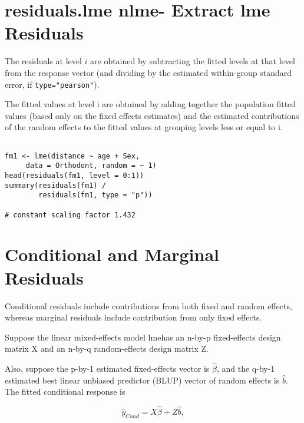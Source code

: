 \documentclass[residuals.tex]{subfiles}
\begin{document}
\section{residuals.lme {nlme}- Extract lme Residuals}

The residuals at level $i$ are obtained by subtracting the fitted levels at that level from the response vector (and dividing by the estimated within-group standard error, if \texttt{type="pearson"}). 

The fitted values at level i are obtained by adding together the population fitted values (based only on the fixed effects estimates) and the estimated contributions of the random effects to the fitted values at grouping levels less or equal to i.
 
 
\begin{framed}
\begin{verbatim}

fm1 <- lme(distance ~ age + Sex, 
     data = Orthodont, random = ~ 1)
head(residuals(fm1, level = 0:1))
summary(residuals(fm1) /
        residuals(fm1, type = "p")) 
        
# constant scaling factor 1.432

\end{verbatim}
\end{framed}


\section*{Conditional and Marginal Residuals}

Conditional residuals include contributions from both fixed and random effects, whereas marginal residuals include contribution from only fixed effects.

Suppose the linear mixed-effects model lmehas an n-by-p fixed-effects design matrix X and an n-by-q random-effects design matrix Z. 

Also, suppose the p-by-1 estimated fixed-effects vector is $\hat{\beta}$, and the q-by-1 estimated best linear unbiased predictor (BLUP) vector of random effects is $\hat{b}$. The fitted conditional response is

\[ \hat{y}_{Cond} = X\hat{\beta}+Z\hat{b},\]
\end{document}
